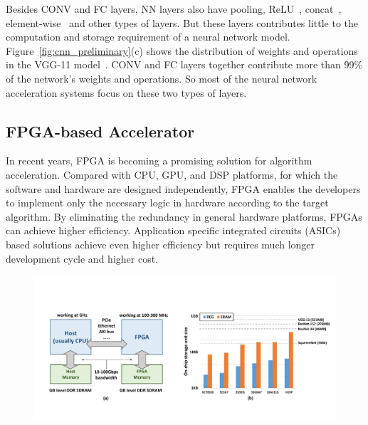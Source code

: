 Besides CONV and FC layers, NN layers also have pooling, ReLU~\cite{krizhevsky2012imagenet}, concat~\cite{szegedy2015going}, element-wise~\cite{he2016deep} and other types of layers. But these layers contributes little to the computation and storage requirement of a neural network model. Figure~\ref{fig:cnn_preliminary}(c) shows the distribution of weights and operations in the VGG-11 model~\cite{simonyan2014very}. CONV and FC layers together contribute more than 99\% of the network's weights and operations. So most of the neural network acceleration systems focus on these two types of layers.


\subsection{FPGA-based Accelerator}\label{sec:preliminary:fpga}

In recent years, FPGA is becoming a promising solution for algorithm acceleration. Compared with CPU, GPU, and DSP platforms, for which the software and hardware are designed independently, FPGA enables the developers to implement only the necessary logic in hardware according to the target algorithm. By eliminating the redundancy in general hardware platforms, FPGAs can achieve higher efficiency. Application specific integrated circuits (ASICs) based solutions achieve even higher efficiency but requires much longer development cycle and higher cost. 

\begin{figure}[ht]
    \centering
    \includegraphics[width=0.9\columnwidth]{fig/fpga_preliminary.pdf}
    \caption{}
    \label{fig:fpga_preliminary}
\end{figure}


